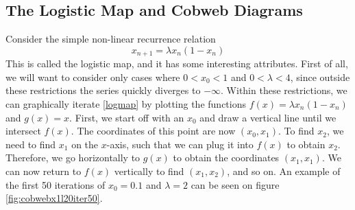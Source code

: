 \documentclass[12pt,oneside,a4paper]{article}
\numberwithin{equation}{section}
\begin{document}
{{{{\subsection{The Logistic Map and Cobweb Diagrams}

Consider the simple non-linear recurrence relation
\begin{equation}
x_{n+1}=\lambda x_n (1-x_n)
\label{logmap}
\end{equation}
This is called the logistic map, and it has some interesting attributes. First 
of all, we will want to consider only cases where $0<x_0<1$ and $0<\lambda<4$, 
since outside these restrictions the series quickly diverges to $-\infty$. 
Within these restrictions, we can graphically iterate \eqref{logmap} by 
plotting the functions $f(x)=\lambda x_n (1-x_n)$ and $g(x)=x$. First, we start 
off with an $x_0$ and draw a vertical line until we intersect $f(x)$. The 
coordinates of this point are now $(x_0,x_1)$. To find $x_2$, we need to find
$x_1$ on the $x$-axis, such that we can plug it into $f(x)$ to obtain $x_2$. 
Therefore, we go horizontally to $g(x)$ to obtain the coordinates $(x_1,x_1)$. 
We can now return to $f(x)$ vertically to find $(x_1,x_2)$, and so on. An 
example of the first 50 iterations of $x_0=0.1$ and $\lambda=2$ can be seen on 
figure \ref{fig:cobwebx1l20iter50}.

}}}}
\end{document}
